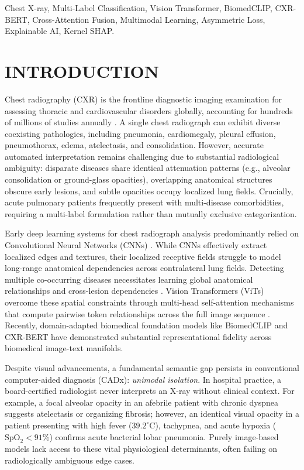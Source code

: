 \documentclass[conference]{IEEEtran}
\begin{document}
\begin{IEEEkeywords}
Chest X-ray, Multi-Label Classification, Vision Transformer, BiomedCLIP, CXR-BERT, Cross-Attention Fusion, Multimodal Learning, Asymmetric Loss, Explainable AI, Kernel SHAP.
\end{IEEEkeywords}

\section{INTRODUCTION}
Chest radiography (CXR) is the frontline diagnostic imaging examination for assessing thoracic and cardiovascular disorders globally, accounting for hundreds of millions of studies annually \cite{wang2017chestxray8}. A single chest radiograph can exhibit diverse coexisting pathologies, including pneumonia, cardiomegaly, pleural effusion, pneumothorax, edema, atelectasis, and consolidation. However, accurate automated interpretation remains challenging due to substantial radiological ambiguity: disparate diseases share identical attenuation patterns (e.g., alveolar consolidation or ground-glass opacities), overlapping anatomical structures obscure early lesions, and subtle opacities occupy localized lung fields. Crucially, acute pulmonary patients frequently present with multi-disease comorbidities, requiring a multi-label formulation rather than mutually exclusive categorization.

Early deep learning systems for chest radiograph analysis predominantly relied on Convolutional Neural Networks (CNNs) \cite{he2016deep, rajpurkar2017chexnet}. While CNNs effectively extract localized edges and textures, their localized receptive fields struggle to model long-range anatomical dependencies across contralateral lung fields. Detecting multiple co-occurring diseases necessitates learning global anatomical relationships and cross-lesion dependencies \cite{pham2021interpreting}. Vision Transformers (ViTs) overcome these spatial constraints through multi-head self-attention mechanisms that compute pairwise token relationships across the full image sequence \cite{dosovitskiy2021an}. Recently, domain-adapted biomedical foundation models like BiomedCLIP \cite{zhang2023biomedclip} and CXR-BERT \cite{boecking2022making} have demonstrated substantial representational fidelity across biomedical image-text manifolds.

Despite visual advancements, a fundamental semantic gap persists in conventional computer-aided diagnosis (CADx): \textit{unimodal isolation}. In hospital practice, a board-certified radiologist never interprets an X-ray without clinical context. For example, a focal alveolar opacity in an afebrile patient with chronic dyspnea suggests atelectasis or organizing fibrosis; however, an identical visual opacity in a patient presenting with high fever ($39.2^\circ\text{C}$), tachypnea, and acute hypoxia ($\text{SpO}_2 < 91\%$) confirms acute bacterial lobar pneumonia. Purely image-based models lack access to these vital physiological determinants, often failing on radiologically ambiguous edge cases.
\end{document}
